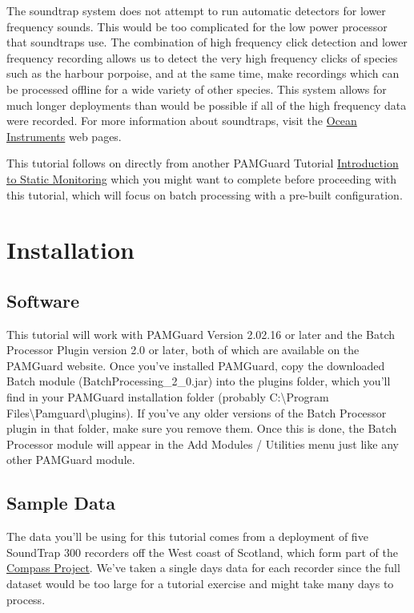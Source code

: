 \documentclass[
]{article}
\begin{document}
The soundtrap system does not attempt to run automatic detectors for
lower frequency sounds. This would be too complicated for the low power
processor that soundtraps use. The combination of high frequency click
detection and lower frequency recording allows us to detect the very
high frequency clicks of species such as the harbour porpoise, and at
the same time, make recordings which can be processed offline for a wide
variety of other species. This system allows for much longer deployments
than would be possible if all of the high frequency data were recorded.
For more information about soundtraps, visit the
\href{https://www.oceaninstruments.co.nz/}{Ocean Instruments} web pages.

This tutorial follows on directly from another PAMGuard Tutorial
\href{https://www.pamguard.org/tutorials/staticmonitoring.html}{Introduction
to Static Monitoring} which you might want to complete before proceeding
with this tutorial, which will focus on batch processing with a
pre-built configuration.

\section{Installation}\label{installation}

\subsection{Software}\label{software}

This tutorial will work with PAMGuard Version 2.02.16 or later and the
Batch Processor Plugin version 2.0 or later, both of which are available
on the PAMGuard website. Once you've installed PAMGuard, copy the
downloaded Batch module (BatchProcessing\_2\_0.jar) into the plugins
folder, which you'll find in your PAMGuard installation folder (probably
C:\textbackslash Program
Files\textbackslash Pamguard\textbackslash plugins). If you've any older
versions of the Batch Processor plugin in that folder, make sure you
remove them. Once this is done, the Batch Processor module will appear
in the Add Modules / Utilities menu just like any other PAMGuard module.

\subsection{Sample Data}\label{sample-data}

The data you'll be using for this tutorial comes from a deployment of
five SoundTrap 300 recorders off the West coast of Scotland, which form
part of the
\href{https://www.sams.ac.uk/science/projects/compass/}{Compass
Project}. We've taken a single days data for each recorder since the
full dataset would be too large for a tutorial exercise and might take
many days to process.
\end{document}
